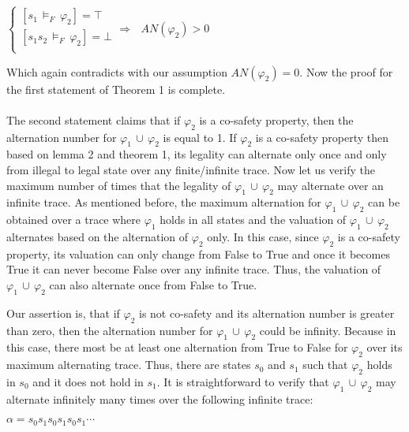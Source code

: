  \begin{center}
$
  \left.
  \begin{cases}
    [s_1 \, \models_F \, \varphi_2] = \top \\
    [s_1 s_2 \, \models_F \, \varphi_2] = \bot \\
  \end{cases}
  \right. 
\Longrightarrow     ~~~   AN(\varphi_2) > 0
$
\end{center}


Which again contradicts with our assumption $AN(\varphi_2) = 0$. Now the proof for the first statement of Theorem 1 is complete. \\ \\ 


The second statement claims that if $\varphi_2$ is a co-safety property, then the alternation number for $ \varphi_1 \, \cup \, \varphi_2$ is equal to 1. If $\varphi_2$ is a co-safety property then based on lemma 2 and theorem 1, its legality can alternate only once and only from illegal to legal state over any finite/infinite trace. 
Now let us verify the maximum number of times that the legality of $ \varphi_1 \, \cup \, \varphi_2$ may alternate over an infinite trace. As mentioned before, the maximum alternation for $ \varphi_1 \, \cup \, \varphi_2$ can be obtained over a trace where $\varphi_1$ holds in all states and the valuation of $ \varphi_1 \, \cup \, \varphi_2$ alternates based on the alternation of $\varphi_2$ only. In this case, since $\varphi_2$ is a co-safety property, its valuation can only change from False to True and once it becomes True it can never become False over any infinite trace. Thus, the valuation of $ \varphi_1 \, \cup \, \varphi_2$ can also alternate once from False to True. 

Our assertion is, that if $\varphi_2$ is not co-safety and its alternation number is greater than zero, then the alternation number for $ \varphi_1 \, \cup \, \varphi_2$ could be infinity. Because in this case, there most be at least one alternation from True to False for $\varphi_2$ over its maximum alternating trace. Thus, there are states $s_0$ and $s_1$ such that $\varphi_2$ holds in $s_0$ and it does not hold in $s_1$.  It is straightforward to verify that $ \varphi_1 \, \cup \, \varphi_2$ may alternate infinitely many times over the following infinite trace:

\begin{center}
$\alpha = s_0s_1s_0s_1s_0s_1 \cdots$
\end{center}

